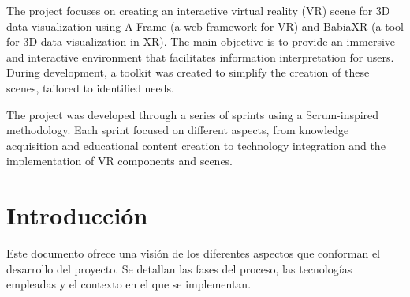 \documentclass[a4paper, 12pt]{book}
\begin{document}
The project focuses on creating an interactive virtual reality (VR) scene for 3D data visualization using A-Frame (a web framework for VR) and BabiaXR (a tool for 3D data visualization in XR). The main objective is to provide an immersive and interactive environment that facilitates information interpretation for users. During development, a toolkit was created to simplify the creation of these scenes, tailored to identified needs.

The project was developed through a series of sprints using a Scrum-inspired methodology. Each sprint focused on different aspects, from knowledge acquisition and educational content creation to technology integration and the implementation of VR components and scenes.




\tableofcontents 
\cleardoublepage
\listoffigures %



\cleardoublepage
\chapter{Introducción}
\label{sec:intro} %

Este documento ofrece una visión de los diferentes aspectos que conforman el desarrollo del proyecto. Se detallan las fases del proceso, las tecnologías empleadas y el contexto en el que se implementan. 
\end{document}
